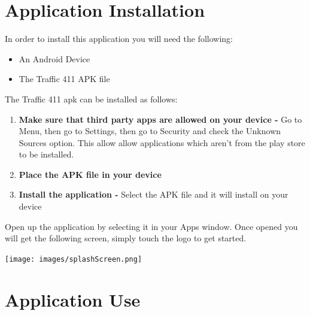 \documentclass[a4paper,12pt]{article}
\begin{document}
\section{Application Installation}
In order to install this application you will need the following:
\begin{itemize}
\item An Android Device
\item The Traffic 411 APK file
\end{itemize}

The Traffic 411 apk can be installed as follows:
\begin{enumerate}
\item \textbf{Make sure that third party apps are allowed on your device -} Go to Menu, then go to Settings, then go to Security and check the Unknown Sources option. This allow allow applications which aren't from the play store to be installed.
\item \textbf{Place the APK file in your device} 
\item \textbf{Install the application -} Select the APK file and it will install on your device
\end{enumerate}

Open up the application by selecting it in your Apps window. Once opened you will get the following screen, simply touch the logo to get started.
\begin{center}
\texttt{[image: images/splashScreen.png]}
\end{center}

\section{Application Use}
\end{document}
